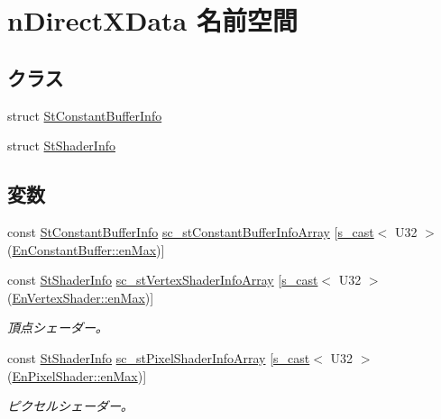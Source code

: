 \hypertarget{namespacen_direct_x_data}{}\section{n\+Direct\+X\+Data 名前空間}
\label{namespacen_direct_x_data}
\subsection*{クラス}
\begin{DoxyCompactItemize}
\item 
struct \hyperlink{structn_direct_x_data_1_1_st_constant_buffer_info}{St\+Constant\+Buffer\+Info}
\item 
struct \hyperlink{structn_direct_x_data_1_1_st_shader_info}{St\+Shader\+Info}
\end{DoxyCompactItemize}
\subsection*{変数}
\begin{DoxyCompactItemize}
\item 
const \hyperlink{structn_direct_x_data_1_1_st_constant_buffer_info}{St\+Constant\+Buffer\+Info} \hyperlink{namespacen_direct_x_data_aee31e6ee976d87b70c57004759800439}{sc\+\_\+st\+Constant\+Buffer\+Info\+Array} \mbox{[}\hyperlink{_lib_utility_8h_a564389767079011d2a47cdb641d81353}{s\+\_\+cast}$<$ U32 $>$(\hyperlink{_constant_buffer_8h_aaf416c55b2e43195b9cf771071e1328aa079bb6413c37006b9fdc56add34e517b}{En\+Constant\+Buffer\+::en\+Max})\mbox{]}
\item 
const \hyperlink{structn_direct_x_data_1_1_st_shader_info}{St\+Shader\+Info} \hyperlink{namespacen_direct_x_data_a979e2d1f73921e7addcba315847438ce}{sc\+\_\+st\+Vertex\+Shader\+Info\+Array} \mbox{[}\hyperlink{_lib_utility_8h_a564389767079011d2a47cdb641d81353}{s\+\_\+cast}$<$ U32 $>$(\hyperlink{_shader_definition_8h_a232ca48c9a8e2a62b45a96e7929a2bdba079bb6413c37006b9fdc56add34e517b}{En\+Vertex\+Shader\+::en\+Max})\mbox{]}
\begin{DoxyCompactList}\small\item\em 頂点シェーダー。 \end{DoxyCompactList}\item 
const \hyperlink{structn_direct_x_data_1_1_st_shader_info}{St\+Shader\+Info} \hyperlink{namespacen_direct_x_data_aa823f5457cf0ccff5042787b83150597}{sc\+\_\+st\+Pixel\+Shader\+Info\+Array} \mbox{[}\hyperlink{_lib_utility_8h_a564389767079011d2a47cdb641d81353}{s\+\_\+cast}$<$ U32 $>$(\hyperlink{_shader_definition_8h_ab8ae26d268e6e5baee47fbba4d03f4cfa079bb6413c37006b9fdc56add34e517b}{En\+Pixel\+Shader\+::en\+Max})\mbox{]}
\begin{DoxyCompactList}\small\item\em ピクセルシェーダー。 \end{DoxyCompactList}\end{DoxyCompactItemize}


